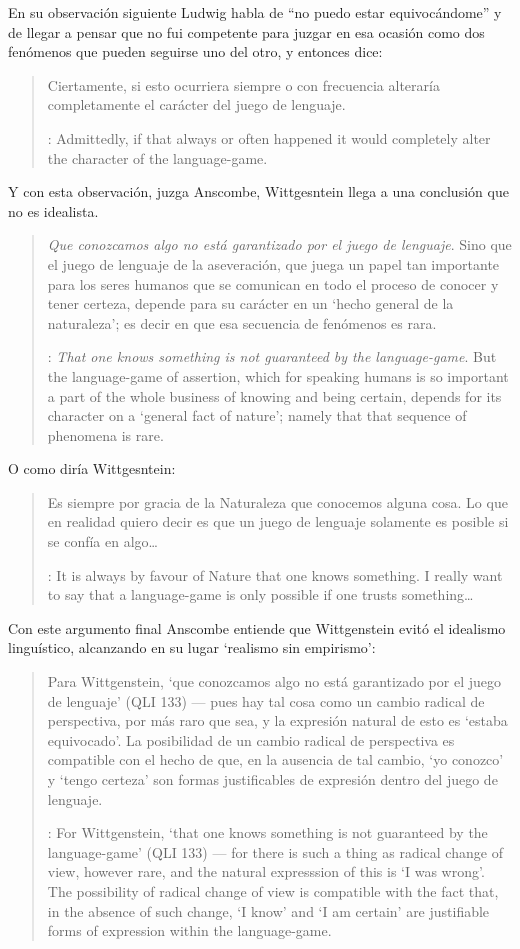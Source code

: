En su observación siguiente Ludwig habla de ``no puedo estar equivocándome'' y de llegar a pensar que no fui competente para juzgar en esa ocasión como dos fenómenos que pueden seguirse uno del otro, y entonces dice: \blockquote[{\cite[\S646]{wittgenstein1969oncert}}: Admittedly, if that always or often happened it would completely alter the character of the language-game.]{Ciertamente, si esto ocurriera siempre o con frecuencia alteraría completamente el carácter del juego de lenguaje.} Y con esta observación, juzga Anscombe, Wittgesntein llega a una conclusión que no es idealista.  \blockquote[{\cite[133]{anscombe1981parmenides:qli}}: \emph{That one knows something is not guaranteed by the language-game}. \textelp{} But the language-game of assertion, which for speaking humans is so important a part of the whole business of knowing and being certain, depends for its character on a `general fact of nature'; namely that that sequence of phenomena is rare.]{\emph{Que conozcamos algo no está garantizado por el juego de lenguaje}. Sino que el juego de lenguaje de la aseveración, que juega un papel tan importante para los seres humanos que se comunican en todo el proceso de conocer y tener certeza, depende para su carácter en un `hecho general de la naturaleza'; es decir en que esa secuencia de fenómenos es rara.} O como diría Wittgesntein: \blockquote[{\cite[\S505; 509]{wittgenstein1969oncert}}: It is always by favour of Nature that one knows something. \textelp{} I really want to say that a language-game is only possible if one trusts something\ldots]{Es siempre por gracia de la Naturaleza que conocemos alguna cosa. \textelp{} Lo que en realidad quiero decir es que un juego de lenguaje solamente es posible si se confía en algo\ldots}.

Con este argumento final Anscombe entiende que Wittgenstein evitó el idealismo linguístico, alcanzando en su lugar `realismo sin empirismo': \blockquote[{\cite[224]{teichmann2008ans}}: For Wittgenstein, `that one knows something is not guaranteed by the language-game' (QLI 133) --- for there is such a thing as radical change of view, however rare, and the natural expresssion of this is `I was wrong'. The possibility of radical change of view is compatible with the fact that, in the absence of such change, `I know' and `I am certain' are justifiable forms of expression within the language-game.]{Para Wittgenstein, `que conozcamos algo no está garantizado por el juego de lenguaje' (QLI 133) --- pues hay tal cosa como un cambio radical de perspectiva, por más raro que sea, y la expresión natural de esto es `estaba equivocado'. La posibilidad de un cambio radical de perspectiva es compatible con el hecho de que, en la ausencia de tal cambio, `yo conozco' y `tengo certeza' son formas justificables de expresión dentro del juego de lenguaje.}

